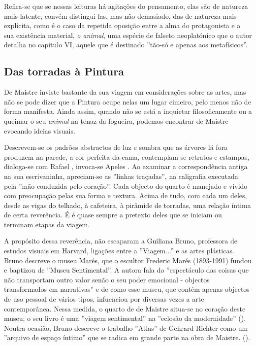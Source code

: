\documentclass[12pt]{article}
\begin{document}
Refira-se que se nessas leituras há agitações do pensamento, elas são
de natureza mais latente, convém distingui-las, mas não demasiado, das
de natureza mais explícita, como é o caso da repetida oposição entre a
alma do protagonista e a sua existência material, \emph{o animal}, uma
espécie de falseto neoplatónico que o autor detalha no capítulo VI,
aquele que é destinado ''tão-só e apenas aos metafísicos''.

\subsection{Das torradas à Pintura}

De Maistre inviste bastante da sua viagem em considerações sobre as
artes, mas não se pode dizer que a Pintura ocupe nelas um lugar
cimeiro, pelo menos não de forma manifesta. Ainda assim, quando não se
está a inquietar filosoficamente ou a queimar o seu \emph{animal} na
tenaz da fogueira, podemos encontrar de Maistre evocando ideias
visuais.

Descrevem-se os padrões abstractos de luz e sombra que as árvores lá
fora produzem na parede, a cor perfeita da cama, contemplam-se
retratos e estampas, dialoga-se com Rafael \cite[p.xxx?]{demaistre},
invoca-se Apeles \cite[p.xxx?]{demaistre}. Ao examinar a
correspondência antiga na sua escrivaninha, apreciam-se as ''linhas
traçadas'', na caligrafia executada pela ''mão conduzida pelo
coração''. Cada objecto do quarto é manejado e vivido com preocupação
pelas sua forma e textura. Acima de tudo, com cada um deles, desde as
vigas do telhado, à cafeteira, à pirâmide de torradas, uma relação
íntima de certa reverência. É é quase sempre a pretexto deles que se
iniciam ou terminam etapas da viagem.

A propósito dessa reverência, não escaparam a Guiliana Bruno,
professora de estudos visuais em Harvard, ligações entre a
''Viagem...'' e as artes plásticas. Bruno descreve o museu Marés, que
o escultor Frederic Marés (1893-1991) fundou e baptizou de ''Museu
Sentimental''. A autora fala do ''espectáculo das coisas que não
transportam outro valor senão o seu poder emocional - objectos
transformados em narrativas'' e de como esse museu, que contém apenas
objectos de uso pessoal de vários tipos, infuenciou por diversas vezes
a arte contemporânea. Nessa medida, o quarto de de Maistre situa-se no
coração deste museu; o seu livro é uma ''viagem sentimental'' na
''eclosão da modernidade'' (\cite[p.133]{bruno2002atlas}). Noutra
ocasião, Bruno descreve o trabalho ''Atlas'' de Gehrard Richter como
um ''arquivo de espaço íntimo'' que se radica em grande parte na obra
de Maistre. (\cite[p.254]{bruno2002atlas}).
\end{document}
